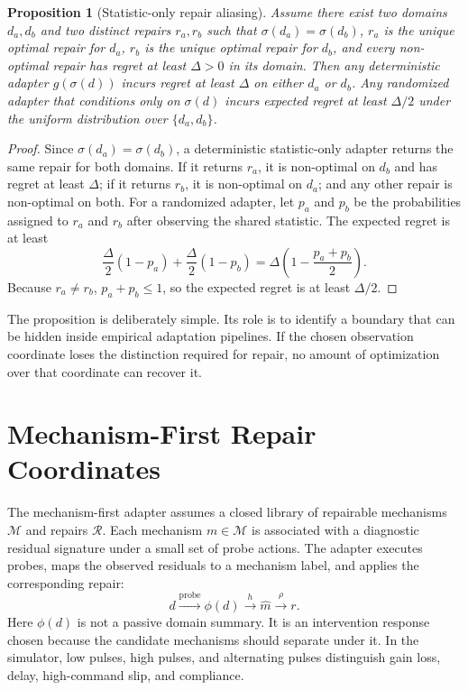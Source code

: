 \documentclass{article}
\newtheorem{proposition}{Proposition}
\begin{document}
\begin{proposition}[Statistic-only repair aliasing]
Assume there exist two domains $d_a,d_b$ and two distinct repairs $r_a,r_b$ such
that $\sigma(d_a)=\sigma(d_b)$, $r_a$ is the unique optimal repair for $d_a$,
$r_b$ is the unique optimal repair for $d_b$, and every non-optimal repair has
regret at least $\Delta>0$ in its domain. Then any deterministic adapter
$g(\sigma(d))$ incurs regret at least $\Delta$ on either $d_a$ or $d_b$. Any
randomized adapter that conditions only on $\sigma(d)$ incurs expected regret at
least $\Delta/2$ under the uniform distribution over $\{d_a,d_b\}$.
\end{proposition}

\begin{proof}
Since $\sigma(d_a)=\sigma(d_b)$, a deterministic statistic-only adapter returns
the same repair for both domains. If it returns $r_a$, it is non-optimal on
$d_b$ and has regret at least $\Delta$; if it returns $r_b$, it is non-optimal on
$d_a$; and any other repair is non-optimal on both. For a randomized adapter, let
$p_a$ and $p_b$ be the probabilities assigned to $r_a$ and $r_b$ after observing
the shared statistic. The expected regret is at least
\[
\frac{\Delta}{2}(1-p_a) + \frac{\Delta}{2}(1-p_b)
= \Delta\left(1-\frac{p_a+p_b}{2}\right).
\]
Because $r_a\neq r_b$, $p_a+p_b\leq 1$, so the expected regret is at least
$\Delta/2$.
\end{proof}

The proposition is deliberately simple. Its role is to identify a boundary that
can be hidden inside empirical adaptation pipelines. If the chosen observation
coordinate loses the distinction required for repair, no amount of optimization
over that coordinate can recover it.

\section{Mechanism-First Repair Coordinates}

The mechanism-first adapter assumes a closed library of repairable mechanisms
$\mathcal{M}$ and repairs $\mathcal{R}$. Each mechanism $m\in\mathcal{M}$ is
associated with a diagnostic residual signature under a small set of probe
actions. The adapter executes probes, maps the observed residuals to a mechanism
label, and applies the corresponding repair:
\[
d \xrightarrow{\mathrm{probe}} \phi(d) \xrightarrow{h} \hat{m}
\xrightarrow{\rho} r .
\]
Here $\phi(d)$ is not a passive domain summary. It is an intervention response
chosen because the candidate mechanisms should separate under it. In the
simulator, low pulses, high pulses, and alternating pulses distinguish gain
loss, delay, high-command slip, and compliance.
\end{document}
